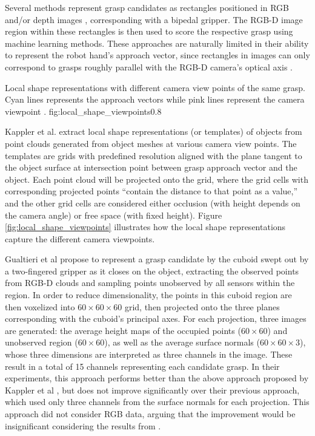 Several methods represent grasp candidates as rectangles positioned in RGB and/or depth images \cite{lenz2015,jiang2011},
corresponding with a bipedal gripper. The RGB-D image region within these rectangles is then used to score the
respective grasp using machine learning methods. These approaches are naturally limited in their ability to represent
the robot hand's approach vector, since rectangles in images can only correspond to grasps roughly parallel with
the RGB-D camera's optical axis \cite{Gualtieri2016}.

             {Local shape representations with different camera view points of the same grasp. Cyan lines represents the
              approach vectors while pink lines represent the camera viewpoint \cite{Kappler2015}.}
             {fig:local_shape_viewpoints}{0.8\textwidth}

Kappler et al. \cite{Kappler2015} extract local shape representations (or templates) of objects from point clouds
generated from object meshes at various camera view points. The templates are grids with predefined resolution
aligned with the plane tangent to the object surface at intersection point between grasp approach vector and the
object. Each point cloud will be projected onto the grid, where the grid cells with corresponding projected points
``contain the distance to that point as a value,'' and the other grid cells are considered either occlusion
(with height depends on the camera angle) or free space (with fixed height). Figure \ref{fig:local_shape_viewpoints}
illustrates how the local shape representations capture the different camera viewpoints.

Gualtieri et al \cite{Gualtieri2016} propose to represent a grasp candidate by the cuboid swept out by a two-fingered
gripper as it closes on the object, extracting the observed points from RGB-D clouds and sampling points unobserved by
all sensors within the region. In order to reduce dimensionality, the points in this cuboid region are then voxelized
into $60 \times 60 \times 60$ grid, then projected onto the three planes corresponding with the cuboid's principal axes.
For each projection, three images are generated: the average height maps of the occupied points ($60 \times 60$) and
unobserved region ($60 \times 60$), as well as the average surface normals ($60 \times 60 \times 3$), whose three
dimensions are interpreted as three channels in the image. These result in a total of 15 channels representing each
candidate grasp. In their experiments, this approach performs better than the above approach proposed by Kappler et al
\cite{Kappler2015}, but does not improve significantly over their previous approach, which used only three channels from
the surface normals for each projection. This approach did not consider RGB data, arguing that the improvement would be
insignificant considering the results from \cite{lenz2015}.

